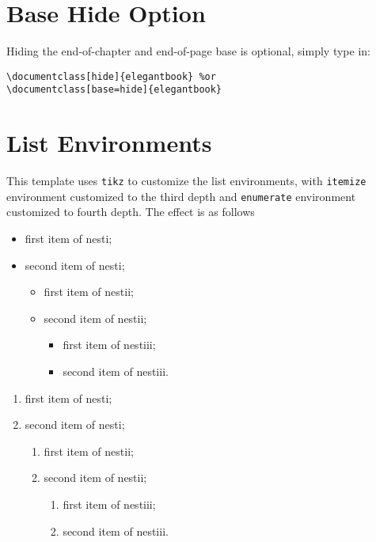 \documentclass[11pt]{elegantbook}
\begin{document}
\section{Base Hide Option}
Hiding the end-of-chapter and end-of-page base is optional, simply type in:
\begin{lstlisting}
\documentclass[hide]{elegantbook} %or
\documentclass[base=hide]{elegantbook}
\end{lstlisting}


\section{List Environments}
This template uses \lstinline{tikz} to customize the list environments, with \lstinline{itemize} environment customized to the third depth and \lstinline{enumerate} environment customized to fourth depth. The effect is as follows\\[2ex]
\begin{minipage}[b]{0.49\textwidth}
\begin{itemize}
   \item first item of nesti;
   \item second item of nesti;
   \begin{itemize}
      \item first item of nestii;
      \item second item of nestii;
      \begin{itemize}
         \item first item of nestiii;
         \item second item of nestiii.
      \end{itemize}   
   \end{itemize}
\end{itemize}
\end{minipage}
\begin{minipage}[b]{0.49\textwidth}
\begin{enumerate}
   \item first item of nesti;
   \item second item of nesti;
   \begin{enumerate}
      \item first item of nestii;
      \item second item of nestii;
      \begin{enumerate}
         \item first item of nestiii;
         \item second item of nestiii.
      \end{enumerate}   
   \end{enumerate}
\end{enumerate}
\end{minipage}
\end{document}
